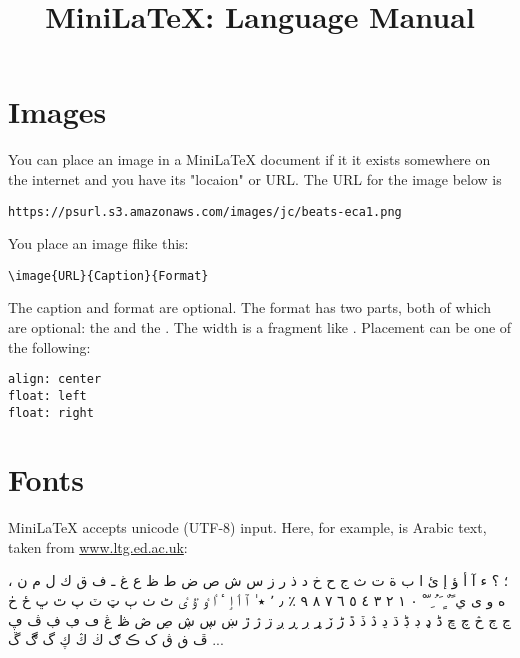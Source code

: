 
\title{MiniLaTeX: Language Manual}

\maketitle

\tableofcontents


\section{Images}

You can place an image in a MiniLaTeX document if it it exists somewhere on the internet and you have its "locaion" or URL.  The URL for the image below is

\begin{verbatim}
https://psurl.s3.amazonaws.com/images/jc/beats-eca1.png
\end{verbatim}

You place an image flike this:

\begin{verbatim}
\image{URL}{Caption}{Format}
\end{verbatim}

The caption and format are optional.  The format has two parts, both of which are optional: the  and the . The width is a fragment like .  Placement can be one of the following:

\begin{verbatim}
align: center
float: left
float: right
\end{verbatim}


\section{Fonts}

MiniLaTeX accepts unicode (UTF-8) input.  Here, for example, is Arabic text,  taken from \href{https://www.ltg.ed.ac.uk/~richard/unicode-sample.html}{www.ltg.ed.ac.uk}:

، ؛ ؟ ء آ أ ؤ إ ئ ا ب ة ت ث ج ح خ د ذ ر ز س ش ص ض ط ظ ع غ ـ ف ق ك ل م ن ه و ى ي ً ٌ ٍ َ ُ ِ ّ ْ ٠ ١ ٢ ٣ ٤ ٥ ٦ ٧ ٨ ٩ ٪ ٫ ٬ ٭ ٰ ٱ ٲ ٳ ٴ ٵ ٶ ٷ ٸ ٹ ٺ ٻ ټ ٽ پ ٿ ڀ ځ ڂ ڃ ڄ څ چ ڇ ڈ ډ ڊ ڋ ڌ ڍ ڎ ڏ ڐ ڑ ڒ ړ ڔ ڕ ږ ڗ ژ ڙ ښ ڛ ڜ ڝ ڞ ڟ ڠ ڡ ڢ ڣ ڤ ڥ ڦ ڧ ڨ ک ڪ ګ ڬ ڭ ڮ گ ڰ ڱ ...


